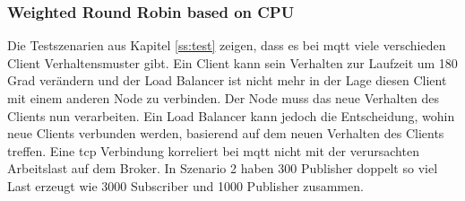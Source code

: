 
\subsubsection{Weighted Round Robin based on CPU}
Die Testszenarien aus Kapitel \ref{ss:test} zeigen, dass es bei \ac{mqtt} viele verschieden Client Verhaltensmuster gibt. Ein Client kann sein Verhalten zur Laufzeit um 180 Grad verändern und der Load Balancer ist nicht mehr in der Lage diesen Client mit einem anderen Node zu verbinden. Der Node muss das neue Verhalten des Clients nun verarbeiten. Ein Load Balancer kann jedoch die Entscheidung, wohin neue Clients verbunden werden, basierend auf dem neuen Verhalten des Clients treffen.
Eine \ac{tcp} Verbindung korreliert bei \ac{mqtt} nicht mit der verursachten Arbeitslast auf dem Broker. In Szenario 2 haben 300 Publisher doppelt so viel Last erzeugt wie 3000 Subscriber und 1000 Publisher zusammen.

